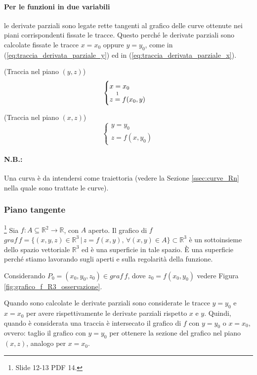 \paragraph{Per le funzioni in due variabili} le derivate parziali sono legate rette tangenti al grafico delle curve ottenute nei piani corrispondenti fissate le tracce. Questo perché le derivate parziali sono calcolate fissate le tracce $x=x_0$ oppure $y=y_0$, come in (\ref{eq:traccia_derivata_parziale_y}) ed in (\ref{eq:traccia_derivata_parziale_x}).

(Traccia nel piano $(y,z)$)
\begin{equation}\label{eq:traccia_derivata_parziale_y}
    \begin{cases}
        x=x_0\\
        z\overset{\footnotemark}{=}f(x_0,y)
    \end{cases}
\end{equation}

(Traccia nel piano $(x,z)$)
\begin{equation}\label{eq:traccia_derivata_parziale_x}
    \begin{cases}
        y=y_0\\
        z=f(x,y_0)
    \end{cases}
\end{equation}

\paragraph{N.B.:} Una curva è da intendersi come traiettoria (vedere la Sezione \ref{ssec:curve_Rn} nella quale sono trattate le curve).

\subsubsection{Piano tangente}\footnote{Slide 12-13 PDF 14.}
Sia $f\colon A\subseteq\mathbb R^2\rightarrow\mathbb R$, con $A$ aperto. Il grafico di $f$ $graf\,f=\{(x,y,z)\in\mathbb R^3\,|\, z=f(x,y),\, \forall (x,y)\in A\}\subset\mathbb R^3$ è un sottoinsieme dello spazio vettoriale $\mathbb R^3$ ed è una superficie in tale spazio. È una superficie perché stiamo lavorando sugli aperti e sulla regolarità della funzione.

Considerando $P_0=(x_0,y_0,z_0)\in graf\, f$, dove $z_0=f(x_0,y_0)$ vedere Figura \ref{fig:grafico_f_R3_osservazione}.

Quando sono calcolate le derivate parziali sono considerate le tracce $y=y_0$ e $x=x_0$ per avere rispettivamente le derivate parziali rispetto $x$ e $y$. Quindi, quando è considerata una traccia è intersecato il grafico di $f$ con $y=y_0$ o $x=x_0$, ovvero: taglio il grafico con $y=y_0$ per ottenere la sezione del grafico nel piano $(x,z)$, analogo per $x=x_0$.

